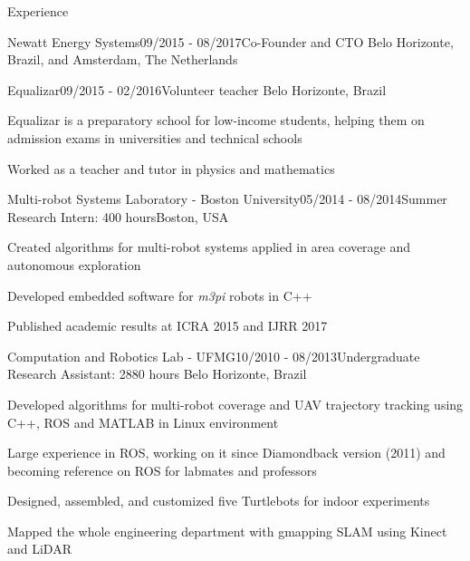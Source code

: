 \documentclass[14pt, a4paper]{resume} %
\begin{document}
\begin{rSection}{Experience}
\begin{rSubsection}{Newatt Energy Systems}{09/2015 - 08/2017}{\normalfont Co-Founder and CTO}{ \normalfont Belo Horizonte, Brazil, and Amsterdam, The Netherlands}
\end{rSubsection}

\begin{rSubsection}{Equalizar}{09/2015 - 02/2016}{\normalfont Volunteer teacher}{ \normalfont Belo Horizonte, Brazil}
	\item Equalizar is a preparatory school for low-income students, helping them on admission exams in universities and technical schools
	\item Worked as a teacher and tutor in physics and mathematics
\end{rSubsection}



\begin{rSubsection}{Multi-robot Systems Laboratory - Boston University}{05/2014 - 08/2014}{\normalfont Summer Research Intern: 400 hours}{\normalfont Boston,  USA}
	\item Created algorithms for multi-robot systems applied in area coverage and autonomous exploration
	\item Developed embedded software for \textit{m3pi} robots in C++
	\item Published academic results at ICRA 2015 and IJRR 2017	
\end{rSubsection}
 

\begin{rSubsection}{Computation and Robotics Lab - UFMG}{10/2010 - 08/2013}{\normalfont Undergraduate Research Assistant: 2880 hours}{ \normalfont Belo Horizonte, Brazil}
 	\item Developed algorithms for multi-robot coverage and UAV trajectory tracking using C++, ROS and MATLAB in Linux environment 
	\item Large experience in ROS, working on it since Diamondback version (2011) and becoming reference on ROS for labmates and professors
 	\item Designed, assembled, and customized five Turtlebots for indoor experiments
	\item Mapped the whole engineering department with gmapping SLAM using Kinect and LiDAR
\end{rSubsection}
\end{rSection}
\end{document}
